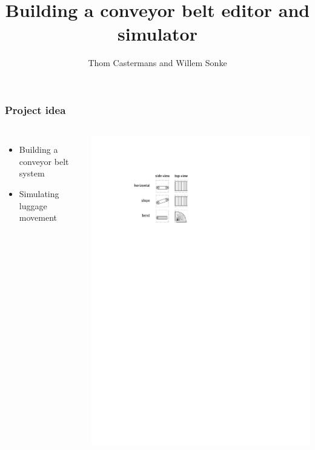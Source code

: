 \documentclass[12pt, aspectratio=169]{beamer} %
\title{Building a conveyor belt editor and simulator}
\author{Thom Castermans and Willem Sonke}
\begin{document}
\begin{titleframe}
\end{titleframe}

\begin{frame}
  \frametitle{Project idea}
  \begin{columns}[c]
      \begin{itemize}
        \item Building a conveyor belt system
        \item Simulating luggage movement
      \end{itemize}
      \includegraphics{imgs/sketch-blocks}
  \end{columns}
\end{frame}
\end{document}
